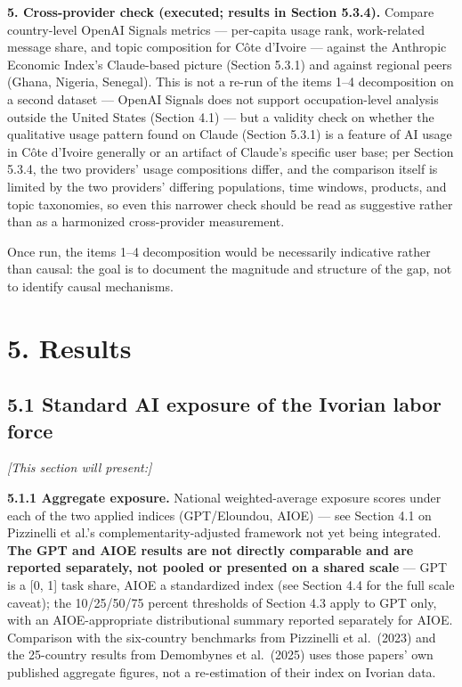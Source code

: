 \documentclass[
  11pt,
]{article}
\begin{document}
\textbf{5. Cross-provider check (executed; results in Section 5.3.4).}
Compare country-level OpenAI Signals metrics --- per-capita usage rank,
work-related message share, and topic composition for Côte d'Ivoire ---
against the Anthropic Economic Index's Claude-based picture (Section
5.3.1) and against regional peers (Ghana, Nigeria, Senegal). This is not
a re-run of the items 1--4 decomposition on a second dataset --- OpenAI
Signals does not support occupation-level analysis outside the United
States (Section 4.1) --- but a validity check on whether the qualitative
usage pattern found on Claude (Section 5.3.1) is a feature of AI usage
in Côte d'Ivoire generally or an artifact of Claude's specific user
base; per Section 5.3.4, the two providers' usage compositions differ,
and the comparison itself is limited by the two providers' differing
populations, time windows, products, and topic taxonomies, so even this
narrower check should be read as suggestive rather than as a harmonized
cross-provider measurement.

Once run, the items 1--4 decomposition would be necessarily indicative
rather than causal: the goal is to document the magnitude and structure
of the gap, not to identify causal mechanisms.

\section{5. Results}\label{results}

\subsection{5.1 Standard AI exposure of the Ivorian labor
force}\label{standard-ai-exposure-of-the-ivorian-labor-force}

\emph{{[}This section will present:{]}}

\textbf{5.1.1 Aggregate exposure.} National weighted-average exposure
scores under each of the two applied indices (GPT/Eloundou, AIOE) ---
see Section 4.1 on Pizzinelli et al.'s complementarity-adjusted
framework not yet being integrated. \textbf{The GPT and AIOE results are
not directly comparable and are reported separately, not pooled or
presented on a shared scale} --- GPT is a {[}0, 1{]} task share, AIOE a
standardized index (see Section 4.4 for the full scale caveat); the
10/25/50/75 percent thresholds of Section 4.3 apply to GPT only, with an
AIOE-appropriate distributional summary reported separately for AIOE.
Comparison with the six-country benchmarks from Pizzinelli et al.~(2023)
and the 25-country results from Demombynes et al.~(2025) uses those
papers' own published aggregate figures, not a re-estimation of their
index on Ivorian data.
\end{document}

